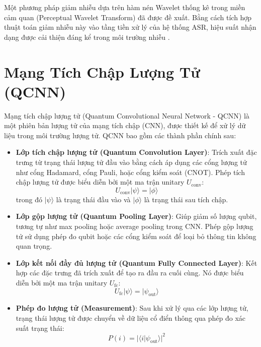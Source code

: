 \documentclass{article}
\begin{document}
Một phương pháp giảm nhiễu dựa trên hàm nén Wavelet thống kê trong miền cảm quan (Perceptual Wavelet Transform) đã được đề xuất. Bằng cách tích hợp thuật toán giảm nhiễu này vào tầng tiền xử lý của hệ thống ASR, hiệu suất nhận dạng được cải thiện đáng kể trong môi trường nhiễu \cite{pham2010}.


\section{Mạng Tích Chập Lượng Tử (QCNN)}

Mạng tích chập lượng tử (Quantum Convolutional Neural Network - QCNN) là một phiên bản lượng tử của mạng tích chập (CNN), được thiết kế để xử lý dữ liệu trong môi trường lượng tử. QCNN bao gồm các thành phần chính sau:

\begin{itemize}
    \item \textbf{Lớp tích chập lượng tử (Quantum Convolution Layer)}: Trích xuất đặc trưng từ trạng thái lượng tử đầu vào bằng cách áp dụng các cổng lượng tử như cổng Hadamard, cổng Pauli, hoặc cổng kiểm soát (CNOT). Phép tích chập lượng tử được biểu diễn bởi một ma trận unitary $U_{\text{conv}}$:
          \begin{equation}
              U_{\text{conv}} | \psi \rangle = | \phi \rangle
          \end{equation}
          trong đó $|\psi\rangle$ là trạng thái đầu vào và $|\phi\rangle$ là trạng thái sau tích chập.

    \item \textbf{Lớp gộp lượng tử (Quantum Pooling Layer)}: Giúp giảm số lượng qubit, tương tự như max pooling hoặc average pooling trong CNN. Phép gộp lượng tử sử dụng phép đo qubit hoặc các cổng kiểm soát để loại bỏ thông tin không quan trọng.

    \item \textbf{Lớp kết nối đầy đủ lượng tử (Quantum Fully Connected Layer)}: Kết hợp các đặc trưng đã trích xuất để tạo ra đầu ra cuối cùng. Nó được biểu diễn bởi một ma trận unitary $U_{\text{fc}}$:
          \begin{equation}
              U_{\text{fc}} | \psi \rangle = | \psi_{\text{out}} \rangle
          \end{equation}

    \item \textbf{Phép đo lượng tử (Measurement)}: Sau khi xử lý qua các lớp lượng tử, trạng thái lượng tử được chuyển về dữ liệu cổ điển thông qua phép đo xác suất trạng thái:
          \begin{equation}
              P(i) = | \langle i | \psi_{\text{out}} \rangle |^2
          \end{equation}
\end{itemize}
\end{document}
